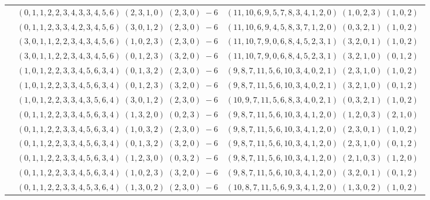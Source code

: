 \documentclass[11pt]{article}
\begin{document}
\begin{longtable}[l]{|c|c|c|}
 \cline{2-3} 
 & $(0 ,1 ,1 ,2 ,2 ,3 ,4 ,3 ,3 ,4 ,5 ,6) \;(2 ,3 ,1 ,0) \;(2 ,3 ,0) \;-6$ & $(11 ,10 ,6 ,9 ,5 ,7 ,8 ,3 ,4 ,1 ,2 ,0) \;(1 ,0 ,2 ,3) \;(1 ,0 ,2) \;$\\ 
 \cline{2-3} 
 & $(0 ,1 ,1 ,2 ,3 ,3 ,4 ,2 ,3 ,4 ,5 ,6) \;(3 ,0 ,1 ,2) \;(2 ,3 ,0) \;-6$ & $(11 ,10 ,6 ,9 ,4 ,5 ,8 ,3 ,7 ,1 ,2 ,0) \;(0 ,3 ,2 ,1) \;(1 ,0 ,2) \;$\\ 
 \cline{2-3} 
 & $(3 ,0 ,1 ,1 ,2 ,2 ,3 ,4 ,3 ,4 ,5 ,6) \;(1 ,0 ,2 ,3) \;(2 ,3 ,0) \;-6$ & $(11 ,10 ,7 ,9 ,0 ,6 ,8 ,4 ,5 ,2 ,3 ,1) \;(3 ,2 ,0 ,1) \;(1 ,0 ,2) \;$\\ 
 \cline{2-3} 
 & $(3 ,0 ,1 ,1 ,2 ,2 ,3 ,4 ,3 ,4 ,5 ,6) \;(0 ,1 ,2 ,3) \;(3 ,2 ,0) \;-6$ & $(11 ,10 ,7 ,9 ,0 ,6 ,8 ,4 ,5 ,2 ,3 ,1) \;(3 ,2 ,1 ,0) \;(0 ,1 ,2) \;$\\ 
 \cline{2-3} 
 & $(1 ,0 ,1 ,2 ,2 ,3 ,3 ,4 ,5 ,6 ,3 ,4) \;(0 ,1 ,3 ,2) \;(2 ,3 ,0) \;-6$ & $(9 ,8 ,7 ,11 ,5 ,6 ,10 ,3 ,4 ,0 ,2 ,1) \;(2 ,3 ,1 ,0) \;(1 ,0 ,2) \;$\\ 
 \cline{2-3} 
 & $(1 ,0 ,1 ,2 ,2 ,3 ,3 ,4 ,5 ,6 ,3 ,4) \;(0 ,1 ,2 ,3) \;(3 ,2 ,0) \;-6$ & $(9 ,8 ,7 ,11 ,5 ,6 ,10 ,3 ,4 ,0 ,2 ,1) \;(3 ,2 ,1 ,0) \;(0 ,1 ,2) \;$\\ 
 \cline{2-3} 
 & $(1 ,0 ,1 ,2 ,2 ,3 ,3 ,4 ,3 ,5 ,6 ,4) \;(3 ,0 ,1 ,2) \;(2 ,3 ,0) \;-6$ & $(10 ,9 ,7 ,11 ,5 ,6 ,8 ,3 ,4 ,0 ,2 ,1) \;(0 ,3 ,2 ,1) \;(1 ,0 ,2) \;$\\ 
 \cline{2-3} 
 & $(0 ,1 ,1 ,2 ,2 ,3 ,3 ,4 ,5 ,6 ,3 ,4) \;(1 ,3 ,2 ,0) \;(0 ,2 ,3) \;-6$ & $(9 ,8 ,7 ,11 ,5 ,6 ,10 ,3 ,4 ,1 ,2 ,0) \;(1 ,2 ,0 ,3) \;(2 ,1 ,0) \;$\\ 
 \cline{2-3} 
 & $(0 ,1 ,1 ,2 ,2 ,3 ,3 ,4 ,5 ,6 ,3 ,4) \;(1 ,0 ,3 ,2) \;(2 ,3 ,0) \;-6$ & $(9 ,8 ,7 ,11 ,5 ,6 ,10 ,3 ,4 ,1 ,2 ,0) \;(2 ,3 ,0 ,1) \;(1 ,0 ,2) \;$\\ 
 \cline{2-3} 
 & $(0 ,1 ,1 ,2 ,2 ,3 ,3 ,4 ,5 ,6 ,3 ,4) \;(0 ,1 ,3 ,2) \;(3 ,2 ,0) \;-6$ & $(9 ,8 ,7 ,11 ,5 ,6 ,10 ,3 ,4 ,1 ,2 ,0) \;(2 ,3 ,1 ,0) \;(0 ,1 ,2) \;$\\ 
 \cline{2-3} 
 & $(0 ,1 ,1 ,2 ,2 ,3 ,3 ,4 ,5 ,6 ,3 ,4) \;(1 ,2 ,3 ,0) \;(0 ,3 ,2) \;-6$ & $(9 ,8 ,7 ,11 ,5 ,6 ,10 ,3 ,4 ,1 ,2 ,0) \;(2 ,1 ,0 ,3) \;(1 ,2 ,0) \;$\\ 
 \cline{2-3} 
 & $(0 ,1 ,1 ,2 ,2 ,3 ,3 ,4 ,5 ,6 ,3 ,4) \;(1 ,0 ,2 ,3) \;(3 ,2 ,0) \;-6$ & $(9 ,8 ,7 ,11 ,5 ,6 ,10 ,3 ,4 ,1 ,2 ,0) \;(3 ,2 ,0 ,1) \;(0 ,1 ,2) \;$\\ 
 \cline{2-3} 
 & $(0 ,1 ,1 ,2 ,2 ,3 ,3 ,4 ,5 ,3 ,6 ,4) \;(1 ,3 ,0 ,2) \;(2 ,3 ,0) \;-6$ & $(10 ,8 ,7 ,11 ,5 ,6 ,9 ,3 ,4 ,1 ,2 ,0) \;(1 ,3 ,0 ,2) \;(1 ,0 ,2) \;$\\ 

\end{longtable}
\end{document}
